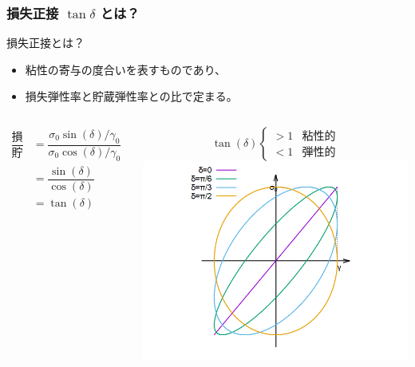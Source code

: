 \documentclass[unicode,12pt]{beamer}%
\begin{document}
\begin{frame}
    \frametitle{損失正接 $\tan \delta$ とは？}
		\begin{block}{損失正接とは？}
			\begin{itemize}
				\item 粘性の寄与の度合いを表すものであり、
				\item 損失弾性率と貯蔵弾性率との比で定まる。
			\end{itemize}

			\begin{columns}[c, onlytextwidth]
				\begin{align*}
					\dfrac{\text{損失弾性率}}{\text{貯蔵弾性率}} &= \dfrac{\sigma_0 \sin(\delta)/\gamma_0}{\sigma_0 \cos(\delta)/\gamma_0} \\
					&= \dfrac{\sin(\delta)}{\cos(\delta)} \\
					&= \tan(\delta)
				\end{align*}

				\vspace{-8mm}
				\begin{equation*}
					\tan(\delta)
					\begin{cases}
						> 1 &\text{粘性的} \\
						< 1 &\text{弾性的}
					\end{cases}
				\end{equation*}
				\centering
				\includegraphics[width=\textwidth]{dynamic_rheo/dyn_rheo_lissajou.png}
			\end{columns}
		\end{block}
\end{frame}
\end{document}
